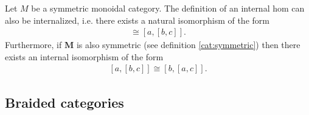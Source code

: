    \begin{property}[Symmetry]
        Let $M$ be a symmetric monoidal category. The definition of an internal hom can also be internalized, i.e. there exists a natural isomorphism of the form
        \begin{gather}
            [a\otimes b, c]\cong[a, [b, c]].
        \end{gather}
        Furthermore, if $\mathbf{M}$ is also symmetric (see definition \ref{cat:symmetric}) then there exists an internal isomorphism of the form
        \begin{gather}
            \label{cat:internal_symmetry}
            [a, [b, c]]\cong[b, [a, c]].
        \end{gather}
    \end{property}

\subsection{Braided categories}

